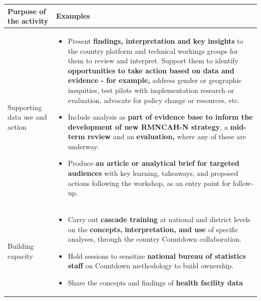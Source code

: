 \documentclass[
  english,
  letterpaper,
  DIV=11,
  numbers=noendperiod]{scrreprt}
\providecommand{\tightlist}{%
  \setlength{\itemsep}{0pt}\setlength{\parskip}{0pt}}
\begin{document}
\begin{longtable}[]{@{}
  >{\raggedright\arraybackslash}p{}
  >{\raggedright\arraybackslash}p{}@{}}
\toprule\noalign{}
\begin{minipage}[b]{\linewidth}\raggedright
Purpose of the activity
\end{minipage} & \begin{minipage}[b]{\linewidth}\raggedright
Examples
\end{minipage} \\
\midrule\noalign{}
\endhead
\bottomrule\noalign{}
\endlastfoot
Supporting data use and action &
\begin{minipage}[t]{\linewidth}\raggedright
\begin{itemize}
\tightlist
\item
  Present \textbf{findings, interpretation and key insights} to the
  country platform and technical workings groups for them to review and
  interpret. Support them to identify \textbf{opportunities to take
  action based on data and evidence - for example,} address gender or
  geographic inequities, test pilots with implementation research or
  evaluation, advocate for policy change or resources, etc.
\item
  Include analysis as \textbf{part of evidence base to inform the
  development of new RMNCAH-N strategy}, a \textbf{mid-term review} and
  an \textbf{evaluation,} where any of these are underway.
\item
  Produce \textbf{an article or analytical brief for targeted audiences}
  with key learning, takeaways, and proposed actions following the
  workshop, as an entry point for follow-up.
\end{itemize}
\end{minipage} \\
Building capacity & \begin{minipage}[t]{\linewidth}\raggedright
\begin{itemize}
\tightlist
\item
  Carry out \textbf{cascade training} at national and district levels on
  the \textbf{concepts,} \textbf{interpretation, and use} of specific
  analyses, through the country Countdown collaboration.
\item
  Hold sessions to sensitize \textbf{national bureau of statistics
  staff} on Countdown methodology to build ownership.
\item
  Share the concepts and findings of \textbf{health facility data
}
\end{itemize}
\end{minipage}
\end{longtable}
\end{document}
